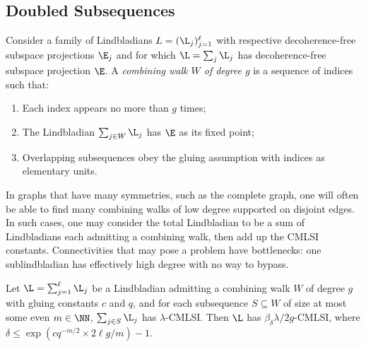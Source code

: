 \subsection{Doubled Subsequences}
\begin{definition} \normalfont
    Consider a family of Lindbladians $L = (\L_j)_{j=1}^\ell$ with respective decoherence-free subspace projections $\E_j$ and for which $\L = \sum_j \L_j$ has decoherence-free subspace projection $\E$. A \emph{combining walk $W$ of degree $g$} is a sequence of indices such that:
    \begin{enumerate}
        \item Each index appears no more than $g$ times;
        \item The Lindbladian $\sum_{j \in W} \L_j$ has $\E$ as its fixed point;
        \item Overlapping subsequences obey the gluing assumption with indices as elementary units.
    \end{enumerate}
\end{definition}
In graphs that have many symmetries, such as the complete graph, one will often be able to find many combining walks of low degree supported on disjoint edges. In such cases, one may consider the total Lindbladian to be a sum of Lindbladians each admitting a combining walk, then add up the CMLSI constants. Connectivities that may pose a problem have bottlenecks: one sublindbladian has effectively high degree with no way to bypass.
\begin{lemma} \label{lem:sequence-chunks}
    Let $\L = \sum_{j=1}^\ell \L_j$ be a Lindbladian admitting a combining walk $W$ of degree $g$ with gluing constants $c$ and $q$, and for each subsequence $S \subseteq W$ of size at most some even $m \in \NN$, $\sum_{j \in S} \L_j$ has $\lambda$-CMLSI. Then $\L$ has $\beta_{\delta} \lambda / 2 g$-CMLSI, where $\delta \leq \exp ( c q^{-m/2} \times 2 \ell g / m ) - 1$.
\end{lemma}
